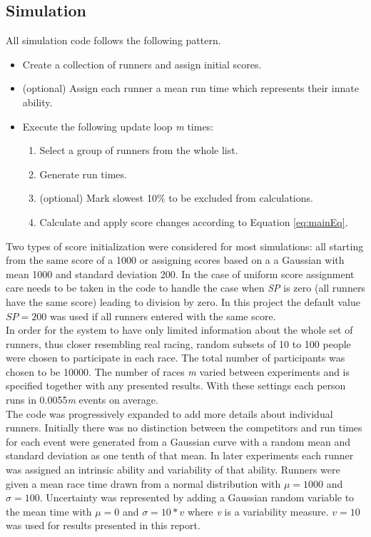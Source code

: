 \subsection{Simulation}
All simulation code follows the following pattern.
\begin{itemize}
\item Create a collection of runners and assign initial scores.
\item (optional) Assign each runner a mean run time which represents their innate ability.
\item Execute the following update loop \emph{m} times:
	\begin{enumerate}
	\item Select a group of runners from the whole list.
	\item Generate run times.
	\item (optional) Mark slowest 10\% to be excluded from calculations.
	\item Calculate and apply score changes according to Equation \ref{eq:mainEq}.
	\end{enumerate}
\end{itemize}
%
Two types of score initialization were considered for most simulations: all starting from the same score of a 1000 or assigning scores based on a a Gaussian with mean 1000 and standard deviation 200. In the case of uniform score assignment care needs to be taken in the code to handle the case when \emph{SP} is zero (all runners have the same score) leading to division by zero. In this project the default value $SP=200$ was used if all runners entered with the same score.\\
In order for the system to have only limited information about the whole set of runners, thus closer resembling real racing, random subsets of 10 to 100 people were chosen to participate in each race. The total number of participants was chosen to be 10000. The number of races \emph{m} varied between experiments and is specified together with any presented results. With these settings each person runs in 0.0055\emph{m} events on average.\\ 
The code was progressively expanded to add more details about individual runners. Initially there was no distinction between the competitors and run times for each event were generated from a Gaussian curve with a random mean and standard deviation as one tenth of that mean. In later experiments each runner was assigned an intrinsic ability and variability of that ability. Runners were given a mean race time drawn from a normal distribution with $\mu=1000$ and $\sigma=100$. Uncertainty was represented by adding a Gaussian random variable to the mean time with $\mu=0$ and $\sigma=10*v$ where \emph{v} is a variability measure. $v=10$ was used for results presented in this report.\\
